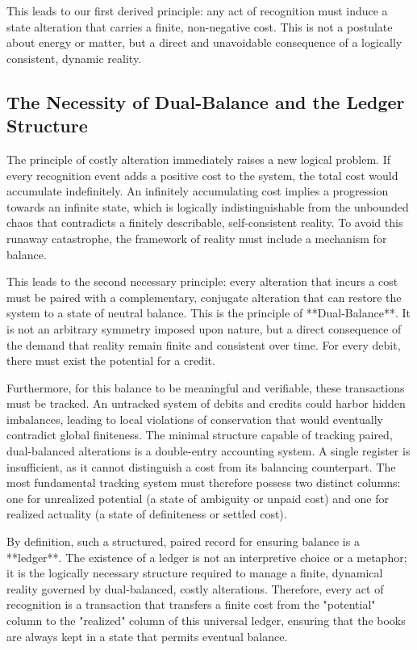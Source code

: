 \documentclass[11pt,a4paper]{article}
\begin{document}
This leads to our first derived principle: any act of recognition must induce a state alteration that carries a finite, non-negative cost. This is not a postulate about energy or matter, but a direct and unavoidable consequence of a logically consistent, dynamic reality.

\subsection{The Necessity of Dual-Balance and the Ledger Structure}
The principle of costly alteration immediately raises a new logical problem. If every recognition event adds a positive cost to the system, the total cost would accumulate indefinitely. An infinitely accumulating cost implies a progression towards an infinite state, which is logically indistinguishable from the unbounded chaos that contradicts a finitely describable, self-consistent reality. To avoid this runaway catastrophe, the framework of reality must include a mechanism for balance.

This leads to the second necessary principle: every alteration that incurs a cost must be paired with a complementary, conjugate alteration that can restore the system to a state of neutral balance. This is the principle of **Dual-Balance**. It is not an arbitrary symmetry imposed upon nature, but a direct consequence of the demand that reality remain finite and consistent over time. For every debit, there must exist the potential for a credit.

Furthermore, for this balance to be meaningful and verifiable, these transactions must be tracked. An untracked system of debits and credits could harbor hidden imbalances, leading to local violations of conservation that would eventually contradict global finiteness. The minimal structure capable of tracking paired, dual-balanced alterations is a double-entry accounting system. A single register is insufficient, as it cannot distinguish a cost from its balancing counterpart. The most fundamental tracking system must therefore possess two distinct columns: one for unrealized potential (a state of ambiguity or unpaid cost) and one for realized actuality (a state of definiteness or settled cost).

By definition, such a structured, paired record for ensuring balance is a **ledger**. The existence of a ledger is not an interpretive choice or a metaphor; it is the logically necessary structure required to manage a finite, dynamical reality governed by dual-balanced, costly alterations. Therefore, every act of recognition is a transaction that transfers a finite cost from the "potential" column to the "realized" column of this universal ledger, ensuring that the books are always kept in a state that permits eventual balance.
\end{document}

